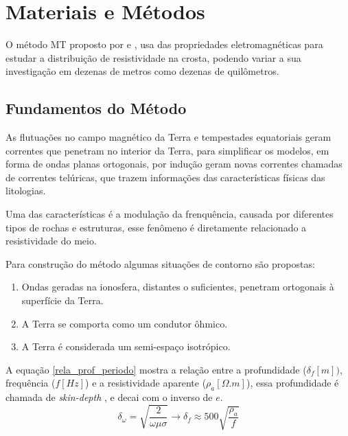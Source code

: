 \chapter{Materiais e Métodos}
    \label{cap-materiais}

    O método MT proposto por \citeauthor{tikhonov50} \citeyearpar{tikhonov50} e
    \citeauthor{cagniard53} \citeyearpar{cagniard53}, usa das propriedades
    eletromagnéticas para estudar a distribuição de resistividade na crosta, 
    podendo variar a sua investigação em dezenas de metros como dezenas de 
    quilômetros.

    \section{Fundamentos do Método}
	\label{embasamento_teorico}

	As flutuações no campo magnético da Terra e tempestades equatoriais
	geram correntes que penetram no interior da Terra, para 
	simplificar os modelos,	em forma de ondas planas ortogonais, por indução
	geram novas correntes chamadas de correntes 
	telúricas, que trazem informações das características físicas das 
	litologias.

	Uma das características é a modulação da frenquência, causada por
	diferentes tipos de rochas e estruturas, esse fenômeno é diretamente 
	relacionado a resistividade do meio.

	Para construção do método algumas situações de contorno são propostas:
	\begin{enumerate}
	    \item Ondas geradas na ionosfera, distantes o suficientes, penetram ortogonais à superfície
 		da Terra.
	    
	    \item A Terra se comporta como um condutor ôhmico.
	    \item A Terra é considerada um semi-espaço isotrópico.
	\end{enumerate}
	
	A equação \ref{rela_prof_periodo} mostra a relação entre a profundidade
	($\delta_f[m])$, frequência ($f[Hz]$) e a resistividade aparente ($\rho_a[\Omega.m]$), essa 
	profundidade é chamada de \textit{skin-depth} \cite{eletromag8hayt}, e decai com o inverso de $e$.
	\begin{equation}
	 \label{rela_prof_periodo}
	 \delta_\omega = \sqrt{\dfrac{2}{\omega \mu \sigma}} \longrightarrow \delta_f \approx 500  \sqrt{\dfrac{\rho_a}{f}}
	\end{equation}
	
